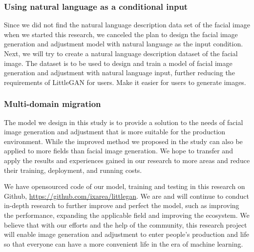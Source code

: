 \subsubsection*{Using natural language as a conditional input}
Since we did not find the natural language description data set of the facial image when we started this research, we canceled the plan to design the facial image generation and adjustment model with natural language as the input condition.
Next, we will try to create a natural language description dataset of the facial image.
The dataset is to be used to design and train a model of facial image generation and adjustment with natural language input, further reducing the requirements of LittleGAN for users.
Make it easier for users to generate images.
\subsubsection*{Multi-domain migration}
The model we design in this study is to provide a solution to the needs of facial image generation and adjustment that is more suitable for the production environment.
While the improved method we proposed in the study can also be applied to more fields than facial image generation.
We hope to transfer and apply the results and experiences gained in our research to more areas and reduce their training, deployment, and running costs.

\vspace{4ex}

We have opensourced code of our model, training and testing in this research on Github, \url{https://github.com/ixarea/littlegan}.
We are and will continue to conduct in-depth research to further improve and perfect the model,
    such as improving the performance, expanding the applicable field and improving the ecosystem.
We believe that with our efforts and the help of the community,
    this research project will enable image generation and adjustment to enter people's production and life
    so that everyone can have a more convenient life in the era of machine learning.






